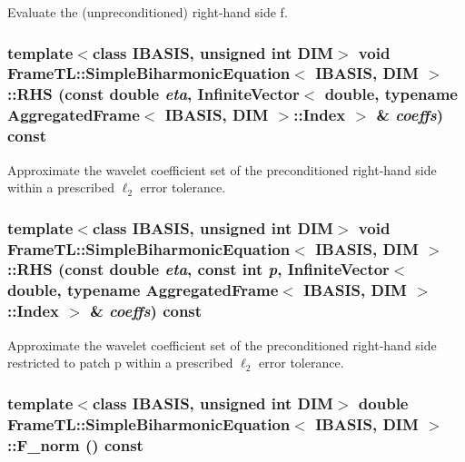 Evaluate the (unpreconditioned) right-hand side f. \hypertarget{classFrameTL_1_1SimpleBiharmonicEquation_1933d37148f59cd1eb3c4b2dcbee396f}{
\subsubsection[RHS]{\setlength{\rightskip}{0pt plus 5cm}template$<$class IBASIS, unsigned int DIM$>$ void {\bf FrameTL::SimpleBiharmonicEquation}$<$ IBASIS, DIM $>$::RHS (const double {\em eta}, \/  InfiniteVector$<$ double, typename {\bf AggregatedFrame}$<$ IBASIS, DIM $>$::{\bf Index} $>$ \& {\em coeffs}) const}}
\label{classFrameTL_1_1SimpleBiharmonicEquation_1933d37148f59cd1eb3c4b2dcbee396f}


Approximate the wavelet coefficient set of the preconditioned right-hand side within a prescribed $\ell_2$ error tolerance. \hypertarget{classFrameTL_1_1SimpleBiharmonicEquation_c3e82086527e9d3306dcabb21ccdda3a}{
\subsubsection[RHS]{\setlength{\rightskip}{0pt plus 5cm}template$<$class IBASIS, unsigned int DIM$>$ void {\bf FrameTL::SimpleBiharmonicEquation}$<$ IBASIS, DIM $>$::RHS (const double {\em eta}, \/  const int {\em p}, \/  InfiniteVector$<$ double, typename {\bf AggregatedFrame}$<$ IBASIS, DIM $>$::{\bf Index} $>$ \& {\em coeffs}) const}}
\label{classFrameTL_1_1SimpleBiharmonicEquation_c3e82086527e9d3306dcabb21ccdda3a}


Approximate the wavelet coefficient set of the preconditioned right-hand side restricted to patch p within a prescribed $\ell_2$ error tolerance. \hypertarget{classFrameTL_1_1SimpleBiharmonicEquation_45b992d91338680827a645647e11c95d}{
\subsubsection[F\_\-norm]{\setlength{\rightskip}{0pt plus 5cm}template$<$class IBASIS, unsigned int DIM$>$ double {\bf FrameTL::SimpleBiharmonicEquation}$<$ IBASIS, DIM $>$::F\_\-norm () const}}
\label{classFrameTL_1_1SimpleBiharmonicEquation_45b992d91338680827a645647e11c95d}


